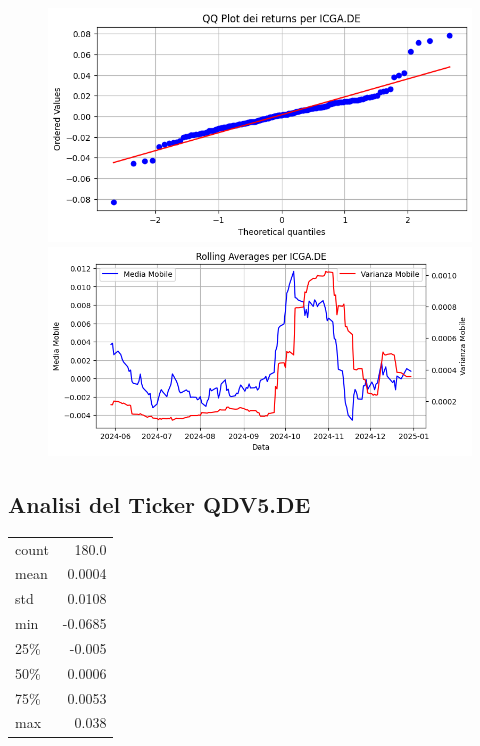 \documentclass{article}%
\begin{document}
%


\begin{figure}[htbp]%
\begin{minipage}{0.48\textwidth}%
\includegraphics[width=\linewidth]{immagini_tickers/ICGA.DE_qq_plot.png}%
\end{minipage}%
\begin{minipage}{0.48\textwidth}%
\includegraphics[width=\linewidth]{immagini_tickers/ICGA.DE_rolling_averages.png}%
\end{minipage}%
\end{figure}

%
\subsection*{Analisi del Ticker QDV5.DE}%
\label{subsec:AnalisidelTickerQDV5.DE}%
\begin{tabular}{lr}%
count&180.0\\%
mean&0.0004\\%
std&0.0108\\%
min&{-}0.0685\\%
25\%&{-}0.005\\%
50\%&0.0006\\%
75\%&0.0053\\%
max&0.038\\%
\end{tabular}%
\end{document}

